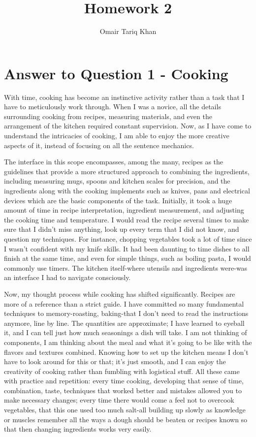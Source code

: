 \documentclass[
	letterpaper, %
]{jdf}
\author{Omair Tariq Khan}
\title{Homework 2}
\begin{document}

\maketitle
\hfill \break
\hfill \break


\section{Answer to Question 1 - Cooking}
With time, cooking has become an instinctive activity rather than a task that I have to meticulously work through. When I was a novice, all the details surrounding cooking from recipes, measuring materials, and even the arrangement of the kitchen required constant supervision. Now, as I have come to understand the intricacies of cooking, I am able to enjoy the more creative aspects of it, instead of focusing on all the sentence mechanics.

The interface in this scope encompasses, among the many, recipes as the guidelines that provide a more structured approach to combining the ingredients, including measuring mugs, spoons and kitchen scales for precision, and the ingredients along with the cooking implements such as knives, pans and electrical devices which are the basic components of the task. Initially, it took a huge amount of time in recipe interpretation, ingredient measurement, and adjusting the cooking time and temperature. I would read the recipe several times to make sure that I didn't miss anything, look up every term that I did not know, and question my techniques. For instance, chopping vegetables took a lot of time since I wasn't confident with my knife skills. It had been daunting to time dishes to all finish at the same time, and even for simple things, such as boiling pasta, I would commonly use timers. The kitchen itself-where utensils and ingredients were-was an interface I had to navigate consciously.

Now, my thought process while cooking has shifted significantly. Recipes are more of a reference than a strict guide. I have committed so many fundamental techniques to memory-roasting, baking-that I don't need to read the instructions anymore, line by line. The quantities are approximate; I have learned to eyeball it, and I can tell just how much seasonings a dish will take. I am not thinking of components, I am thinking about the meal and what it's going to be like with the flavors and textures combined. Knowing how to set up the kitchen means I don't have to look around for this or that; it's just smooth, and I can enjoy the creativity of cooking rather than fumbling with logistical stuff. All these came with practice and repetition: every time cooking, developing that sense of time, combination, taste, techniques that worked better and mistakes allowed you to make necessary changes; every time there would come a feel not to overcook vegetables, that this one used too much salt-all building up slowly as knowledge or muscles remember all the ways a dough should be beaten or recipes known so that then changing ingredients works very easily.
\end{document}
